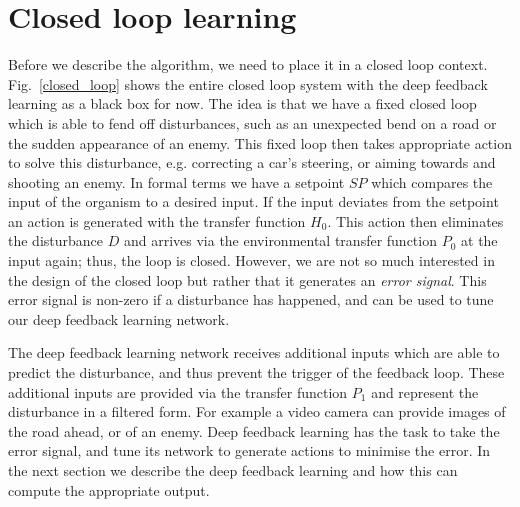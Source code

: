 \documentclass{aamas2018}
\begin{document}
\section{Closed loop learning}
Before we describe the algorithm, we need to place it in a closed loop
context. Fig.~\ref{closed_loop} shows the entire closed loop system
with the deep feedback learning as a black box for now. The idea is
that we have a fixed closed loop which is able to fend off
disturbances, such as an unexpected bend on a road or the sudden
appearance of an enemy. This fixed loop then takes appropriate action
to solve this disturbance, e.g. correcting a car's steering, or aiming
towards and shooting an enemy. In formal terms we have a setpoint $SP$
which compares the input of the organism to a desired input. If the input
deviates from the setpoint an action is generated with the transfer
function $H_0$. This action then eliminates the disturbance $D$ and
arrives via the environmental transfer function $P_0$ at the input
again; thus, the loop is closed. However, we are not so much
interested in the design of the closed loop but rather that it
generates an \textsl{error signal}. This error signal is non-zero if a
disturbance has happened, and can be used to tune our deep feedback
learning network.

The deep feedback learning network receives additional inputs which are able
to predict the disturbance, and thus prevent the trigger of the feedback
loop. These additional inputs are provided via the transfer function $P_1$
and represent the disturbance in a filtered form. For example a video camera
can provide images of the road ahead, or of an enemy. Deep feedback
learning has the task to take the error signal, and tune its network
to generate actions to minimise the error. In the next section
we describe the deep feedback learning and how this can
compute the appropriate output.
\end{document}
